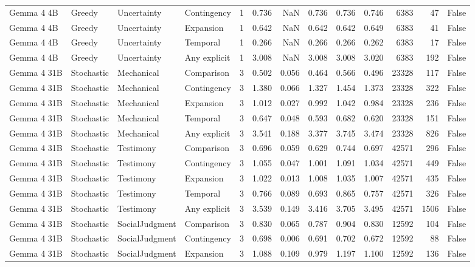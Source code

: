 \begin{tabular}{llllrrrrrrrrr}
Gemma 4 4B & Greedy & Uncertainty & Contingency & 1 & 0.736 & NaN & 0.736 & 0.736 & 0.746 & 6383 & 47 & False \\
Gemma 4 4B & Greedy & Uncertainty & Expansion & 1 & 0.642 & NaN & 0.642 & 0.642 & 0.649 & 6383 & 41 & False \\
Gemma 4 4B & Greedy & Uncertainty & Temporal & 1 & 0.266 & NaN & 0.266 & 0.266 & 0.262 & 6383 & 17 & False \\
Gemma 4 4B & Greedy & Uncertainty & Any explicit & 1 & 3.008 & NaN & 3.008 & 3.008 & 3.020 & 6383 & 192 & False \\
Gemma 4 31B & Stochastic & Mechanical & Comparison & 3 & 0.502 & 0.056 & 0.464 & 0.566 & 0.496 & 23328 & 117 & False \\
Gemma 4 31B & Stochastic & Mechanical & Contingency & 3 & 1.380 & 0.066 & 1.327 & 1.454 & 1.373 & 23328 & 322 & False \\
Gemma 4 31B & Stochastic & Mechanical & Expansion & 3 & 1.012 & 0.027 & 0.992 & 1.042 & 0.984 & 23328 & 236 & False \\
Gemma 4 31B & Stochastic & Mechanical & Temporal & 3 & 0.647 & 0.048 & 0.593 & 0.682 & 0.620 & 23328 & 151 & False \\
Gemma 4 31B & Stochastic & Mechanical & Any explicit & 3 & 3.541 & 0.188 & 3.377 & 3.745 & 3.474 & 23328 & 826 & False \\
Gemma 4 31B & Stochastic & Testimony & Comparison & 3 & 0.696 & 0.059 & 0.629 & 0.744 & 0.697 & 42571 & 296 & False \\
Gemma 4 31B & Stochastic & Testimony & Contingency & 3 & 1.055 & 0.047 & 1.001 & 1.091 & 1.034 & 42571 & 449 & False \\
Gemma 4 31B & Stochastic & Testimony & Expansion & 3 & 1.022 & 0.013 & 1.008 & 1.035 & 1.007 & 42571 & 435 & False \\
Gemma 4 31B & Stochastic & Testimony & Temporal & 3 & 0.766 & 0.089 & 0.693 & 0.865 & 0.757 & 42571 & 326 & False \\
Gemma 4 31B & Stochastic & Testimony & Any explicit & 3 & 3.539 & 0.149 & 3.416 & 3.705 & 3.495 & 42571 & 1506 & False \\
Gemma 4 31B & Stochastic & SocialJudgment & Comparison & 3 & 0.830 & 0.065 & 0.787 & 0.904 & 0.830 & 12592 & 104 & False \\
Gemma 4 31B & Stochastic & SocialJudgment & Contingency & 3 & 0.698 & 0.006 & 0.691 & 0.702 & 0.672 & 12592 & 88 & False \\
Gemma 4 31B & Stochastic & SocialJudgment & Expansion & 3 & 1.088 & 0.109 & 0.979 & 1.197 & 1.100 & 12592 & 136 & False \\

\end{tabular}
